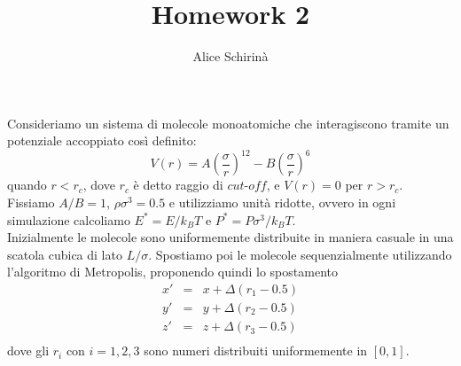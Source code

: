 \documentclass[a4paper,11pt]{article}
\begin{document}
\title{\sc Homework 2}
\author{\sc Alice Schirinà}
\maketitle

\noindent Consideriamo un sistema di molecole monoatomiche che interagiscono tramite un potenziale accoppiato così definito:
\begin{equation*}
V(r) = A \left( \frac{\sigma}{r}\right)^{12} - B \left( \frac{\sigma}{r}\right)^6
\end{equation*}
quando $ r <r_c $, dove $ r_c $ è detto raggio di $\textit{cut-off}$, e $V(r) =0$ per $ r >r_c $. Fissiamo $ A/B =1$, $\rho \sigma^3=0.5$ e utilizziamo unità ridotte, ovvero in ogni simulazione calcoliamo $ E^*=E/k_BT$ e $ P^*=P\sigma^3/k_BT $. \\
Inizialmente le molecole sono uniformemente distribuite in maniera casuale in una scatola cubica di lato $ L/\sigma $. Spostiamo poi le molecole sequenzialmente utilizzando l'algoritmo di Metropolis, proponendo quindi lo spostamento
\begin{eqnarray*}
	x'&=&x+\Delta (r_1 - 0.5)\\
	y'&=&y+\Delta (r_2 - 0.5)\\
	z'&=&z+\Delta (r_3 - 0.5)\\
\end{eqnarray*}
\medskip
dove gli $ r_i $ con $ i=1,2,3$ sono numeri distribuiti uniformemente in $[0,1]$.
\end{document}
